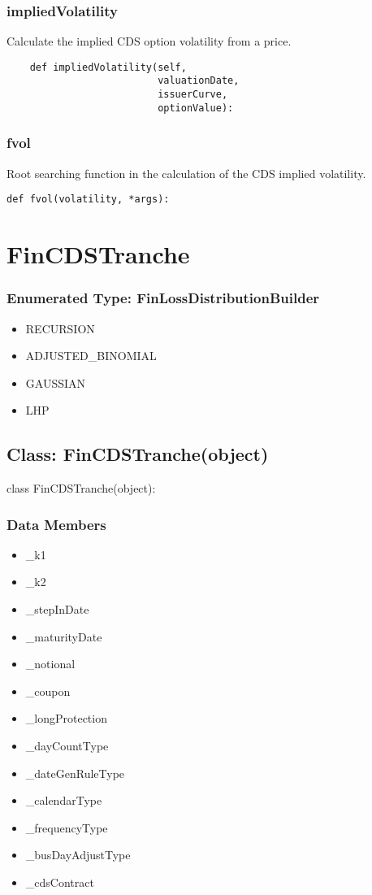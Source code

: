 \documentclass[twoside,11pt]{book}
\begin{document}
\subsubsection*{{\bf impliedVolatility}}
Calculate the implied CDS option volatility from a price.  

\begin{lstlisting}
    def impliedVolatility(self,
                          valuationDate,
                          issuerCurve,
                          optionValue):
\end{lstlisting}

\subsubsection*{{\bf fvol}}
Root searching function in the calculation of the CDS implied volatility.  

\begin{lstlisting}
def fvol(volatility, *args):
\end{lstlisting}

\newpage
\section{FinCDSTranche}

\subsubsection{Enumerated Type: FinLossDistributionBuilder}
\begin{itemize}
\item{RECURSION}
\item{ADJUSTED\_BINOMIAL}
\item{GAUSSIAN}
\item{LHP}
\end{itemize}

\subsection*{Class: FinCDSTranche(object)}
class FinCDSTranche(object): 

\subsubsection*{Data Members}
\begin{itemize}
\item{\_k1}
\item{\_k2}
\item{\_stepInDate}
\item{\_maturityDate}
\item{\_notional}
\item{\_coupon}
\item{\_longProtection}
\item{\_dayCountType}
\item{\_dateGenRuleType}
\item{\_calendarType}
\item{\_frequencyType}
\item{\_busDayAdjustType}
\item{\_cdsContract}
\end{itemize}
\end{document}
